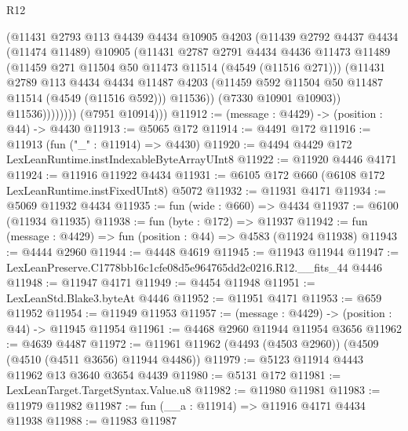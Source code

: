 \begin{lexlean}{R12}
\begin{coremodule}
                      (@11431
                        @2793
                        @113
                        @4439
                        @4434
                        @10905
                        @4203
                        (@11439
                          @2792
                          @4437
                          @4434
                          (@11474 @11489)
                          @10905
                          (@11431
                            @2787
                            @2791
                            @4434
                            @4436
                            @11473
                            @11489
                            (@11459 @271 @11504 @50 @11473 @11514 (@4549 (@11516 @271)))
                            (@11431
                              @2789
                              @113
                              @4434
                              @4434
                              @11487
                              @4203
                              (@11459 @592 @11504 @50 @11487 @11514 (@4549 (@11516 @592)))
                              @11536))
                          (@7330 @10901 @10903))
                        @11536))))))))
        (@7951 @10914)))
@11912 := (message : @4429) -> (position : @44) -> @4430
@11913 := @5065 @172
@11914 := @4491 @172
@11916 := @11913 (fun ("_" : @11914) => @4430)
@11920 := @4494 @4429 @172 LexLeanRuntime.instIndexableByteArrayUInt8
@11922 := @11920 @4446 @4171
@11924 := @11916 @11922 @4434
@11931 := @6105 @172 @660 (@6108 @172 LexLeanRuntime.instFixedUInt8) @5072
@11932 := @11931 @4171
@11934 := @5069 @11932 @4434
@11935 := fun (wide : @660) => @4434
@11937 := @6100 (@11934 @11935)
@11938 := fun (byte : @172) => @11937
@11942 := fun (message : @4429) => fun (position : @44) => @4583 (@11924 @11938)
@11943 := @4444 @2960
@11944 := @4448 @4619
@11945 := @11943 @11944
@11947 := LexLeanPreserve.C1778bb16c1cfe08d5e964765dd2c0216.R12.__fits_44 @4446
@11948 := @11947 @4171
@11949 := @4454 @11948
@11951 := LexLeanStd.Blake3.byteAt @4446
@11952 := @11951 @4171
@11953 := @659 @11952
@11954 := @11949 @11953
@11957 := (message : @4429) -> (position : @44) -> @11945 @11954
@11961 := @4468 @2960 @11944 @11954 @3656
@11962 := @4639 @4487
@11972 := @11961 @11962 (@4493 (@4503 @2960)) (@4509 (@4510 (@4511 @3656) @11944 @4486))
@11979 := @5123 @11914 @4443 @11962 @13 @3640 @3654 @4439
@11980 := @5131 @172
@11981 := LexLeanTarget.TargetSyntax.Value.u8
@11982 := @11980 @11981
@11983 := @11979 @11982
@11987 := fun (__a : @11914) => @11916 @4171 @4434 @11938
@11988 := @11983 @11987

\end{coremodule}
\end{lexlean}
